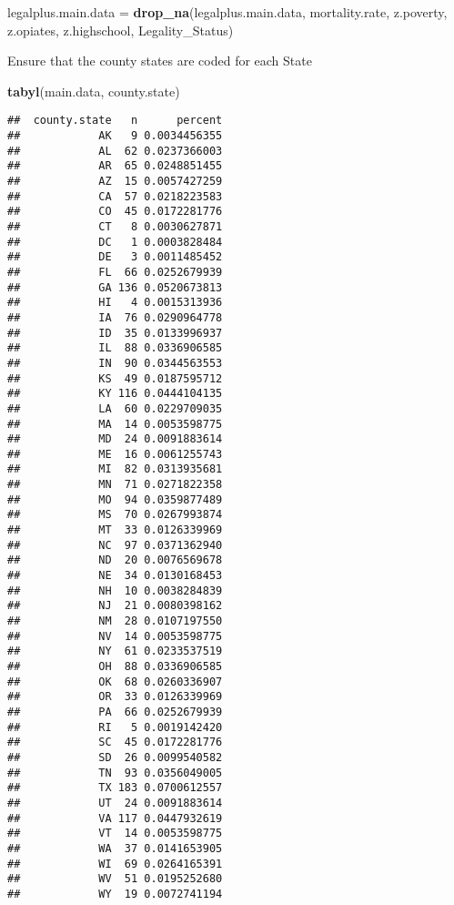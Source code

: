 \documentclass[
]{article}
\newenvironment{Shaded}{\begin{snugshade}}{\end{snugshade}}
\newcommand{\FunctionTok}[1]{\textcolor[rgb]{0.13,0.29,0.53}{\textbf{#1}}}
\newcommand{\NormalTok}[1]{#1}
\newcommand{\OtherTok}[1]{\textcolor[rgb]{0.56,0.35,0.01}{#1}}
\begin{document}
\begin{Shaded}
\begin{Highlighting}[]
\NormalTok{legalplus.main.data }\OtherTok{=} \FunctionTok{drop\_na}\NormalTok{(legalplus.main.data, mortality.rate, z.poverty, z.opiates, z.highschool, Legality\_Status)}
\end{Highlighting}
\end{Shaded}

Ensure that the county states are coded for each State

\begin{Shaded}
\begin{Highlighting}[]
\FunctionTok{tabyl}\NormalTok{(main.data, county.state)}
\end{Highlighting}
\end{Shaded}

\begin{verbatim}
##  county.state   n      percent
##            AK   9 0.0034456355
##            AL  62 0.0237366003
##            AR  65 0.0248851455
##            AZ  15 0.0057427259
##            CA  57 0.0218223583
##            CO  45 0.0172281776
##            CT   8 0.0030627871
##            DC   1 0.0003828484
##            DE   3 0.0011485452
##            FL  66 0.0252679939
##            GA 136 0.0520673813
##            HI   4 0.0015313936
##            IA  76 0.0290964778
##            ID  35 0.0133996937
##            IL  88 0.0336906585
##            IN  90 0.0344563553
##            KS  49 0.0187595712
##            KY 116 0.0444104135
##            LA  60 0.0229709035
##            MA  14 0.0053598775
##            MD  24 0.0091883614
##            ME  16 0.0061255743
##            MI  82 0.0313935681
##            MN  71 0.0271822358
##            MO  94 0.0359877489
##            MS  70 0.0267993874
##            MT  33 0.0126339969
##            NC  97 0.0371362940
##            ND  20 0.0076569678
##            NE  34 0.0130168453
##            NH  10 0.0038284839
##            NJ  21 0.0080398162
##            NM  28 0.0107197550
##            NV  14 0.0053598775
##            NY  61 0.0233537519
##            OH  88 0.0336906585
##            OK  68 0.0260336907
##            OR  33 0.0126339969
##            PA  66 0.0252679939
##            RI   5 0.0019142420
##            SC  45 0.0172281776
##            SD  26 0.0099540582
##            TN  93 0.0356049005
##            TX 183 0.0700612557
##            UT  24 0.0091883614
##            VA 117 0.0447932619
##            VT  14 0.0053598775
##            WA  37 0.0141653905
##            WI  69 0.0264165391
##            WV  51 0.0195252680
##            WY  19 0.0072741194
\end{verbatim}
\end{document}
